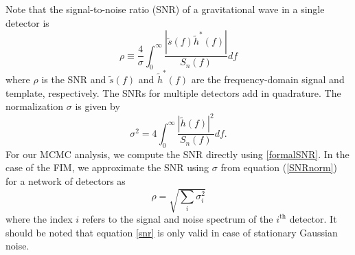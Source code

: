 \documentclass{emulateapj}
\begin{document}
Note that the signal-to-noise ratio (SNR) of a gravitational wave in a
single detector is
\begin{equation}
  \rho \equiv \frac{4}{\sigma} \int^{\infty}_{0}\frac{| \tilde{s}(f)\tilde{h}^{*}(f)|}{S_{n}(f)}df
  \label{formalSNR}
\end{equation}
where $\rho$ is the SNR and $\tilde s(f)$ and $\tilde{h}^{*}(f)$ are
the frequency-domain signal and template, respectively.  The SNRs for
multiple detectors add in quadrature.  The normalization $\sigma$ is
given by
\begin{equation}
  \sigma^2 = 4\int^{\infty}_{0}\frac{| \tilde{h}(f)|^2}{S_n(f)}df.
  \label{SNRnorm}
\end{equation}
For our MCMC analysis, we compute the SNR directly using
\eqref{formalSNR}.  In the case of the FIM, we approximate the SNR
using $\sigma$ from equation (\ref{SNRnorm}) for a network of
detectors as
\begin{equation}
\rho = \sqrt{\sum_i \sigma_i^2}
\label{snr}
\end{equation}
where the index $i$ refers to the signal and noise spectrum of the
$i^{\text{th}}$ detector.  It should be noted that equation
\eqref{snr} is only valid in case of stationary Gaussian noise.
\end{document}

